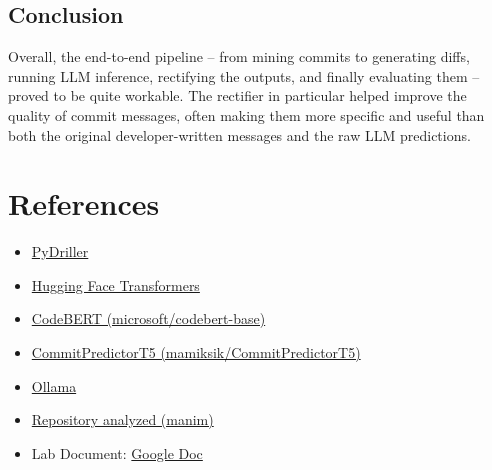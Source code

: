 \documentclass[10pt,a4paper]{report}
\begin{document}
\subsection{Conclusion}
Overall, the end-to-end pipeline -- from mining commits to generating diffs, running LLM inference, rectifying the outputs, and finally evaluating them -- proved to be quite workable. The rectifier in particular helped improve the quality of commit messages, often making them more specific and useful than both the original developer-written messages and the raw LLM predictions.


\section{References}
\begin{itemize}[itemsep=0.05em, topsep=0pt]
    \item \href{https://pydriller.readthedocs.io}{PyDriller}
    \item \href{https://huggingface.co/docs/transformers}{Hugging Face Transformers}
    \item \href{https://huggingface.co/microsoft/codebert-base}{CodeBERT (microsoft/codebert-base)}
    \item \href{https://huggingface.co/mamiksik/CommitPredictorT5}{CommitPredictorT5 (mamiksik/CommitPredictorT5)}
    \item \href{https://ollama.ai}{Ollama}
    \item \href{https://github.com/3b1b/manim}{Repository analyzed (manim)}
    \item Lab Document: \href{https://drive.google.com/file/d/1L4pCGQCekeELjgOJ4HxQ-Tso0QaOKIDf/view}{Google Doc}
\end{itemize}
\end{document}
